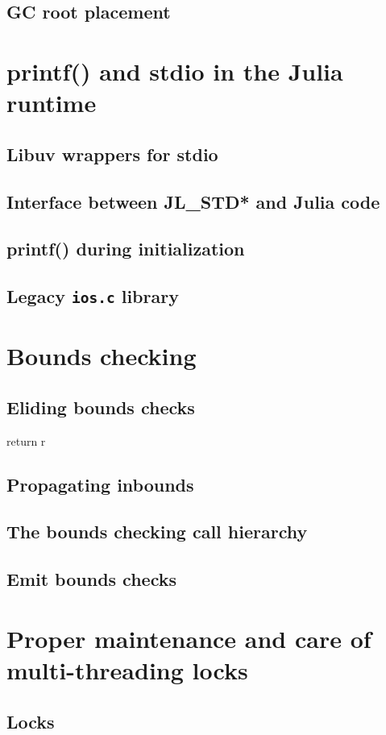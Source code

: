     \subsection{GC root placement}
    \section{printf() and stdio in the Julia runtime}
    \subsection{Libuv wrappers for stdio}
    \subsection{Interface between JL\_STD* and Julia code}
    \subsection{printf() during initialization}
    \subsection{Legacy \texttt{ios.c} library}
    \section{Bounds checking}
    \subsection{Eliding bounds checks}
    return r
    \subsection{Propagating inbounds}
    \subsection{The bounds checking call hierarchy}
    \subsection{Emit bounds checks}
    \section{Proper maintenance and care of multi-threading locks}
    \subsection{Locks}
